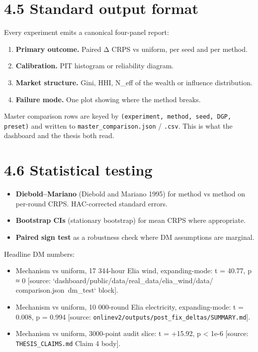 \documentclass[11pt,a4paper,openany]{report}
\begin{document}
\section{4.5 Standard output format}

Every experiment emits a canonical four-panel report:

\begin{enumerate}
  \item \textbf{Primary outcome.} Paired Δ CRPS vs uniform, per seed and per
    method.
  \item \textbf{Calibration.} PIT histogram or reliability diagram.
  \item \textbf{Market structure.} Gini, HHI, N\_eff of the wealth or influence
    distribution.
  \item \textbf{Failure mode.} One plot showing where the method breaks.
\end{enumerate}

Master comparison rows are keyed by
\texttt{(experiment, method, seed, DGP, preset)} and written to
\texttt{master\_comparison.json} / \texttt{.csv}. This is what the dashboard and the
thesis both read.

\section{4.6 Statistical testing}

\begin{itemize}
  \item \textbf{Diebold–Mariano} (Diebold and Mariano 1995) for method vs method
    on per-round CRPS. HAC-corrected standard errors.
  \item \textbf{Bootstrap CIs} (stationary bootstrap) for mean CRPS where
    appropriate.
  \item \textbf{Paired sign test} as a robustness check where DM assumptions are
    marginal.
\end{itemize}

Headline DM numbers:

\begin{itemize}
  \item Mechanism vs uniform, 17 344-hour Elia wind, expanding-mode:
    t = 40.77, p ≈ 0
    [source: `dashboard/public/data/real\_data/elia\_wind/data/
    comparison.json\texttt{ }dm\_test` block].
  \item Mechanism vs uniform, 10 000-round Elia electricity, expanding-mode:
    t = 0.008, p = 0.994
    [source: \texttt{onlinev2/outputs/post\_fix\_deltas/SUMMARY.md}].
  \item Mechanism vs uniform, 3000-point audit slice: t = +15.92, p < 1e-6
    [source: \texttt{THESIS\_CLAIMS.md} Claim 4 body].
\end{itemize}
\end{document}
